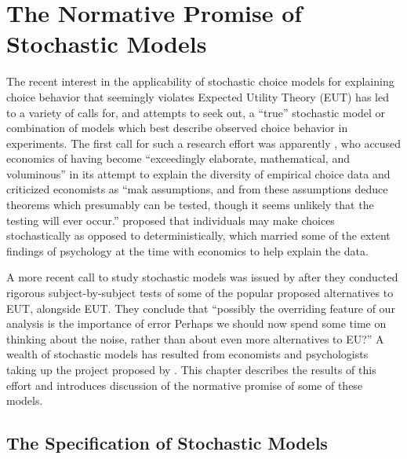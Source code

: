 \documentclass[../main.tex]{subfiles}
\begin{document}
\doublespacing
\setcounter{chapter}{1}
\singlespacing
\chapter{The Normative Promise of Stochastic Models}
\doublespacing

\lltoc

The recent interest in the applicability of stochastic choice models for explaining choice behavior that seemingly violates Expected Utility Theory (EUT) has led to a variety of calls for, and attempts to seek out, a \enquote{true} stochastic model or combination of  models which best describe observed choice behavior in experiments.
The first call for such a research effort was apparently \textcite{Edwards1954}, who accused economics of having become \enquote{exceedingly elaborate, mathematical, and voluminous} \textcite[380]{Edwards1954} in its attempt to explain the diversity of empirical choice data and criticized economists as \enquote{mak assumptions, and from these assumptions \textelp{} deduce theorems which presumably can be tested, though it seems unlikely that the testing will ever occur.}
\textcite{Edwards1954} proposed that individuals may make choices stochastically as opposed to deterministically, which married some of the extent findings of psychology at the time with economics to help explain the data.

A more recent call to study stochastic models was issued by \textcite[1321]{Hey1994} after they conducted rigorous subject-by-subject tests of some of the popular proposed alternatives to EUT, alongside EUT.
They conclude that \enquote{possibly the overriding feature of our analysis is the importance of error \textelp{} Perhaps we should now spend some time on thinking about the noise, rather than about even more alternatives to EU?}
A wealth of stochastic models has resulted from economists and psychologists taking up the project proposed by \textcite{Hey1994}.
This chapter describes the results of this effort and introduces discussion of the normative promise of some of these models.

\singlespacing
\section{The Specification of Stochastic Models}
\doublespacing
\end{document}
